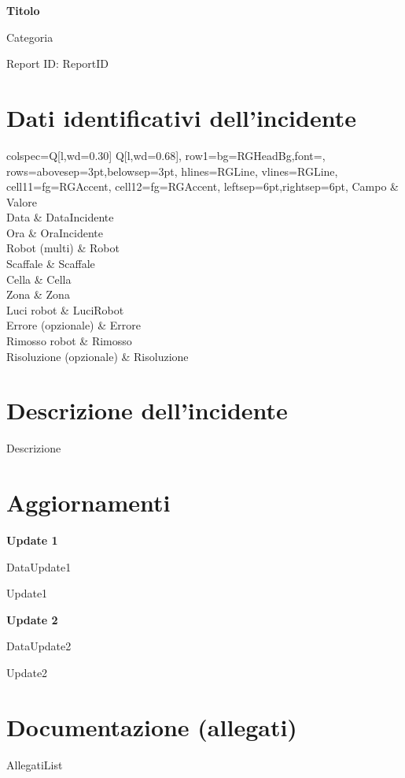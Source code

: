 \documentclass[11pt,a4paper]{article}
\newcommand{\ReportID}{ {{{ReportID}}} }
\newcommand{\DataIncidente}{ {{{DataIncidente}}} }
\newcommand{\OraIncidente}{ {{{OraIncidente}}} }
\newcommand{\Categoria}{ {{{Categoria}}} }
\newcommand{\Titolo}{ {{{Titolo}}} }
\newcommand{\Robot}{ {{{Robot}}} }
\newcommand{\Scaffale}{ {{{Scaffale}}} }
\newcommand{\Cella}{ {{{Cella}}} }
\newcommand{\Zona}{ {{{Zona}}} }
\newcommand{\LuciRobot}{ {{{LuciRobot}}} }
\newcommand{\Errore}{ {{{Errore}}} }
\newcommand{\Rimosso}{ {{{Rimosso}}} }
\newcommand{\Risoluzione}{ {{{Risoluzione}}} }
\newcommand{\Descrizione}{ {{{Descrizione}}} }
\newcommand{\DataUpdateOne}{ {{{DataUpdate1}}} }
\newcommand{\UpdateOne}{ {{{Update1}}} }
\newcommand{\DataUpdateTwo}{ {{{DataUpdate2}}} }
\newcommand{\UpdateTwo}{ {{{Update2}}} }
\newcommand{\AllegatiList}{%
{{{AllegatiList}}}
}
\newcommand{\KVTable}[1]{%
  \begin{tblr}{
    colspec={Q[l,wd=0.30\linewidth] Q[l,wd=0.68\linewidth]},
    row{1}={bg=RGHeadBg,font=\bfseries},
    rows={abovesep=3pt,belowsep=3pt},
    hlines={RGLine},
    vlines={RGLine},
    cell{1}{1}={fg=RGAccent},
    cell{1}{2}={fg=RGAccent},
    leftsep=6pt,rightsep=6pt,
  }
  Campo & Valore \\
  #1
  \end{tblr}
}
\begin{document}
{\LARGE \textbf{\Titolo}}\par
\vspace{1.5mm}
{\large \textcolor{RGGray}{\Categoria}}\par
\vspace{1.5mm}
{\small \textcolor{RGGray}{Report ID: \ReportID}}\par
\vspace{6mm}

\section*{Dati identificativi dell'incidente}

\KVTable{
Data & \DataIncidente \\
Ora & \OraIncidente \\
Robot (multi) & \Robot \\
Scaffale & \Scaffale \\
Cella & \Cella \\
Zona & \Zona \\
Luci robot & \LuciRobot \\
Errore (opzionale) & \Errore \\
Rimosso robot & \Rimosso \\
Risoluzione (opzionale) & \Risoluzione \\
}

\vspace{5mm}

\section*{Descrizione dell'incidente}
\noindent \Descrizione

\vspace{5mm}

\section*{Aggiornamenti}

\noindent\textbf{Update 1}\par
\textcolor{RGGray}{\DataUpdateOne}\par
\vspace{1mm}
\noindent \UpdateOne

\vspace{4mm}

\noindent\textbf{Update 2}\par
\textcolor{RGGray}{\DataUpdateTwo}\par
\vspace{1mm}
\noindent \UpdateTwo

\vspace{5mm}

\section*{Documentazione (allegati)}
\begin{itemize}
\setlength{\itemsep}{2pt}
\AllegatiList
\end{itemize}
\end{document}
